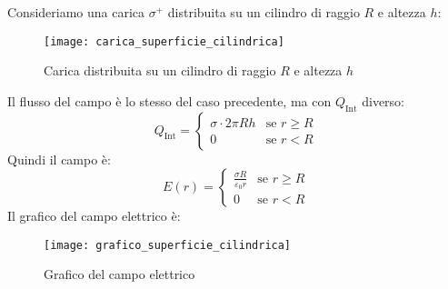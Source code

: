 \documentclass[a4paper]{article}
\begin{document}
\begin{example}
  Consideriamo una carica \( \sigma^+ \) distribuita su un cilindro di raggio \( R \) e
  altezza \( h \):
  \begin{figure}[H]
    \centering
    \texttt{[image: carica\_superficie\_cilindrica]}
    \caption{Carica distribuita su un cilindro di raggio \( R \) e altezza \( h \)}
  \end{figure}
  Il flusso del campo è lo stesso del caso precedente, ma con \( Q_{\text{Int}} \) diverso:
  \[
    Q_{\text{Int}} =
    \begin{cases}
      \sigma \cdot 2 \pi R h & \text{se } r \ge R\\
      0 & \text{se } r < R
    \end{cases}
  \] 
  Quindi il campo è:
  \[
    E(r) = \begin{cases}
      \frac{\sigma R}{\varepsilon_0 r} & \text{se } r \ge R\\
      0 & \text{se } r < R
    \end{cases}
  \]
  Il grafico del campo elettrico è:
  \begin{figure}[H]
    \centering
    \texttt{[image: grafico\_superficie\_cilindrica]}
    \caption{Grafico del campo elettrico}
  \end{figure}
\end{example}
\end{document}
